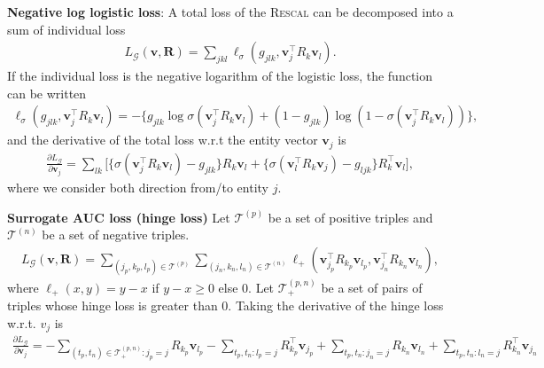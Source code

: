 \documentclass{article} %
\theoremstyle{definition}
\newcommand\bs{\boldsymbol}
\begin{document}
\textbf{Negative log logistic loss}:
A total loss of the \textsc{Rescal} can be decomposed into a sum of individual loss
\begin{align}
L_\mathcal{G}(\mathbf{v}, \mathbf{R}) = \sum_{jkl} \ell_\sigma(g_{jlk}, \bs{v}_j^\top R_k \bs{v}_l).
\end{align}
If the individual loss is the negative logarithm of the logistic loss, the function can be written
\begin{align}
\ell_\sigma(g_{jlk}, \bs{v}_j^\top R_k \bs{v}_l) = - \bigg\{g_{jlk} \log \sigma(\bs{v}_j^\top R_k \bs{v}_l) + (1- g_{jlk}) \log (1- \sigma(\bs{v}_j^\top R_k \bs{v}_l))\bigg\},
\end{align}
and the derivative of the total loss w.r.t the entity vector $\bs{v}_j$ is
\begin{align}
\frac{\partial L_\mathcal{G}}{\partial \bs{v}_j} =  \sum_{lk}\bigg[\Big\{\sigma(\bs{v}_j^\top R_k \bs{v}_l) - g_{jlk}\Big\} R_k \bs{v}_l + \Big\{\sigma(\bs{v}_l^\top R_k \bs{v}_j) - g_{ljk}\Big\} R_k^\top \bs{v}_l \bigg],
\end{align}
where we consider both direction from/to entity $j$.

\textbf{Surrogate AUC loss (hinge loss)}
Let $\mathcal{T}^{(p)}$ be a set of positive triples and $\mathcal{T}^{(n)}$ be a set of negative triples.
\begin{align}
L_\mathcal{G}(\mathbf{v}, \mathbf{R}) = \sum_{(j_p,k_p,l_p) \in \mathcal{T}^{(p)}}\sum_{(j_n, k_n, l_n) \in \mathcal{T}^{(n)}} \ell_+(\bs{v}_{j_p}^\top R_{k_p} \bs{v}_{l_p}, \bs{v}_{j_n}^\top R_{k_n} \bs{v}_{l_n}),
\end{align}
where $\ell_+(x, y) = y - x$ if $y - x \geq 0$ else 0. Let $\mathcal{T}_+^{(p,n)}$ be a set of pairs of triples whose hinge loss is greater than 0. Taking the derivative of the hinge loss w.r.t. $v_j$ is
\begin{align}
\frac{\partial L_\mathcal{G}}{\partial \bs{v}_j} = - \sum_{(t_p, t_n) \in \mathcal{T}_+^{(p,n)} : j_p = j} R_{k_p}\bs{v}_{l_p} - \sum_{t_p, t_n: l_p = j} R_{k_p}^\top \bs{v}_{j_p} + \sum_{t_p, t_n: j_n = j} R_{k_n}\bs{v}_{l_n}  + \sum_{t_p, t_n: l_n = j} R_{k_n}^\top \bs{v}_{j_n}
\end{align}



\end{document}
